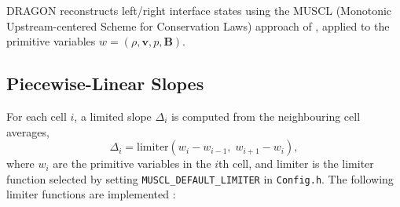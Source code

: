 \documentclass[11pt]{report}
\newcommand{\cpp}[1]{\lstinline[language=C++]{#1}}
\newcommand{\bash}[1]{\lstinline[language=bash]{#1}}
\begin{document}
DRAGON reconstructs left/right interface states using the MUSCL (Monotonic Upstream-centered Scheme for Conservation Laws) approach of \citet{vanLeer1979}, applied to the primitive variables $w = (\rho,  \mathbf{v}, p, \mathbf{B})$.

\subsection{Piecewise-Linear Slopes}

For each cell $i$, a limited slope $\Delta_i$ is computed from the neighbouring cell averages,
\begin{equation} \label{eq:MUSCL_lim}
    \Delta_i = \mathrm{limiter}\!\left( w_i - w_{i-1},\; w_{i+1} - w_i \right),
\end{equation}
where $w_i$ are the primitive variables in the $i$th cell, and limiter is the limiter function selected by setting \cpp{MUSCL_DEFAULT_LIMITER} in \bash{Config.h}.
The following limiter functions are implemented \citep{Roe1986,vanLeer1974,vanLeer1977,vanAlbada1982}:
\end{document}
